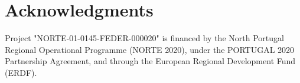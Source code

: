 \section*{Acknowledgments}\label{sec:acknowledgments}

Project "NORTE-01-0145-FEDER-000020" is financed by the North Portugal Regional Operational Programme (NORTE 2020), under the PORTUGAL 2020 Partnership Agreement, and through the European Regional Development Fund (ERDF).
